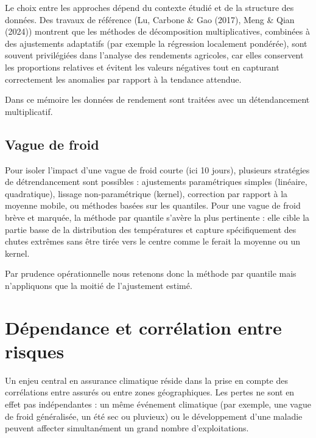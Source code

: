\documentclass[11pt,a4paper,openright,twoside]{report}
\begin{document}
Le choix entre les approches dépend du contexte étudié et de la structure des données. Des travaux de référence (Lu, Carbone \& Gao (2017), Meng \& Qian (2024)) montrent que les méthodes de décomposition multiplicatives, combinées à des ajustements adaptatifs (par exemple la régression localement pondérée), sont souvent privilégiées dans l’analyse des rendements agricoles, car elles conservent les proportions relatives et évitent les valeurs négatives tout en capturant correctement les anomalies par rapport à la tendance attendue.

Dans ce mémoire les données de rendement sont traitées avec un détendancement multiplicatif.

\subsection{Vague de froid}
Pour isoler l’impact d’une vague de froid courte (ici 10 jours), plusieurs stratégies de détrendancement sont possibles : ajustements paramétriques simples (linéaire, quadratique), lissage non-paramétrique (kernel), correction par rapport à la moyenne mobile, ou méthodes basées sur les quantiles. Pour une vague de froid brève et marquée, la méthode par quantile s’avère la plus pertinente : elle cible la partie basse de la distribution des températures et capture spécifiquement des chutes extrêmes sans être tirée vers le centre comme le ferait la moyenne ou un kernel. 

Par prudence opérationnelle nous retenons donc la méthode par quantile mais n’appliquons que la moitié de l’ajustement estimé. 


\section{Dépendance et corrélation entre risques}
Un enjeu central en assurance climatique réside dans la prise en compte des corrélations entre assurés ou entre zones géographiques. Les pertes ne sont en effet pas indépendantes : un même événement climatique (par exemple, une vague de froid généralisée, un été sec ou pluvieux) ou le développement d'une maladie peuvent affecter simultanément un grand nombre d’exploitations.
\end{document}
